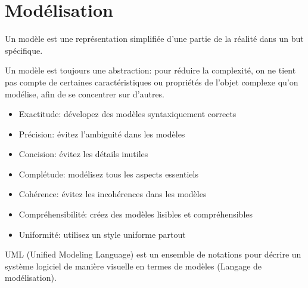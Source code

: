 \section{Modélisation}\label{sec:diagramme_modelisation}
\begin{definition}[Modèle]
    Un modèle est une représentation simplifiée d’une partie de la réalité dans un but spécifique.
\end{definition}
Un modèle est toujours une abstraction: pour réduire la complexité, on ne tient pas compte de certaines caractéristiques ou propriétés de l’objet complexe qu’on modélise, afin de se concentrer sur d’autres.

\begin{itemize}
    \item Exactitude: dévelopez des modèles syntaxiquement corrects
    \item Précision: évitez l’ambiguité dans les modèles 
    \item Concision: évitez les détails inutiles
    \item Complétude: modélisez tous les aspects essentiels 
    \item Cohérence: évitez les incohérences dans les modèles
    \item Compréhensibilité: créez des modèles lisibles et compréhensibles
    \item Uniformité: utilisez un style uniforme partout
\end{itemize}


\begin{definition}
    UML (Unified Modeling Language) est un ensemble de notations pour décrire un système logiciel de manière visuelle en termes de modèles (Langage de modélisation).
\end{definition}



